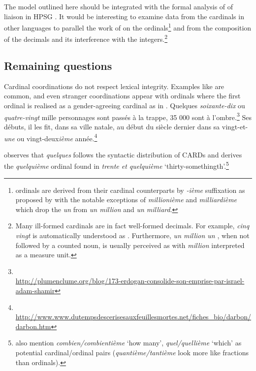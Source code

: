 \documentclass[output=paper]{langsci/langscibook}
\begin{document}
The model outlined here should be integrated with the formal analysis of \cite{BoBoTse04} of liaison  in HPSG \citep{Pollard94}. It would be interesting to examine data from the cardinals  in other languages to parallel the work of \cite{Stump10} on the ordinals\footnote{ ordinals are derived from their cardinal counterparts by \emph{-ième} suffixation as proposed by \cite[p. 228]{Stump10} with the notable exceptions of \emph{millionième} and \emph{milliardième} which drop the \emph{un} from \emph{un million} and \emph{un milliard}.} and from the composition  of the decimals and its interference with the integers.\footnote{Many ill-formed cardinals  are in fact well-formed decimals. For example, \emph{cinq vingt} is automatically understood as . Furthermore, \emph{un million un}  , when not followed by a counted noun, is usually perceived as  with \emph{million} interpreted as a measure unit.}

\subsection{Remaining questions}

Cardinal coordinations do not respect lexical integrity. Examples like  are common, and
even stranger coordinations appear with ordinals where the first ordinal is realised as a gender-agreeing cardinal as in .
\ea\label{cardCoord}
	\ea\label{multCoord} Quelques \emph{soixante-dix} ou \emph{quatre-vingt} mille personnages sont passés à la trappe, 35 000 sont à l'ombre.\footnote{\\\url{http://plumenclume.org/blog/173-erdogan-consolide-son-emprise-par-israel-adam-shamir}}
	\ex\label{ordCoord} Ses débuts, il les fit, dans sa ville natale, au début du siècle dernier dans sa vingt-et-\emph{une} ou vingt-deux\emph{ième} année.\footnote{\\\url{http://www.www.dutempsdescerisesauxfeuillesmortes.net/fiches_bio/darbon/darbon.htm}}
	\z
\z

\cite{Saulnier08} observes that \emph{quelques} follows the syntactic distribution of CARDs and derives the \emph{quelquième} ordinal found in \emph{trente et quelquième} `thirty-somethingth'.\footnote{\cite{FradinSaulnier09} also mention \emph{combien/combientième} `how many', \emph{quel/quellième} `which' as potential cardinal/ordinal pairs (\emph{quantième/tantième} look more like fractions than ordinals).}
\end{document}
